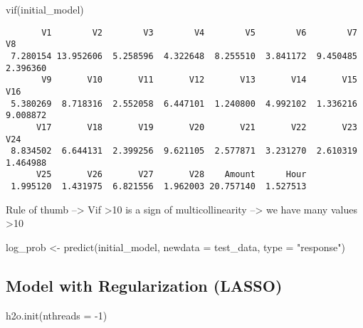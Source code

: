 \documentclass[
  11pt,
  letterpaper,
  DIV=11,
  numbers=noendperiod]{scrartcl}
\newenvironment{Shaded}{}{}
\newcommand{\AttributeTok}[1]{\textcolor[rgb]{0.84,0.23,0.29}{#1}}
\newcommand{\DecValTok}[1]{\textcolor[rgb]{0.00,0.36,0.77}{#1}}
\newcommand{\FunctionTok}[1]{\textcolor[rgb]{0.44,0.26,0.76}{#1}}
\newcommand{\NormalTok}[1]{\textcolor[rgb]{0.14,0.16,0.18}{#1}}
\newcommand{\OtherTok}[1]{\textcolor[rgb]{0.44,0.26,0.76}{#1}}
\newcommand{\SpecialCharTok}[1]{\textcolor[rgb]{0.00,0.36,0.77}{#1}}
\newcommand{\StringTok}[1]{\textcolor[rgb]{0.01,0.18,0.38}{#1}}
\begin{document}
\begin{enumerate}
\begin{Shaded}
\begin{Highlighting}[]
\FunctionTok{vif}\NormalTok{(initial\_model)}
\end{Highlighting}
\end{Shaded}

\begin{verbatim}
       V1        V2        V3        V4        V5        V6        V7        V8 
 7.280154 13.952606  5.258596  4.322648  8.255510  3.841172  9.450485  2.396360 
       V9       V10       V11       V12       V13       V14       V15       V16 
 5.380269  8.718316  2.552058  6.447101  1.240800  4.992102  1.336216  9.008872 
      V17       V18       V19       V20       V21       V22       V23       V24 
 8.834502  6.644131  2.399256  9.621105  2.577871  3.231270  2.610319  1.464988 
      V25       V26       V27       V28    Amount      Hour 
 1.995120  1.431975  6.821556  1.962003 20.757140  1.527513 
\end{verbatim}
\end{enumerate}

Rule of thumb --\textgreater{} Vif \textgreater10 is a sign of
multicollinearity --\textgreater{} we have many values \textgreater10

\begin{Shaded}
\begin{Highlighting}[]
\NormalTok{log\_prob }\OtherTok{\textless{}{-}} \FunctionTok{predict}\NormalTok{(initial\_model, }\AttributeTok{newdata =}\NormalTok{ test\_data, }\AttributeTok{type =} \StringTok{"response"}\NormalTok{)}
\end{Highlighting}
\end{Shaded}

\subsection{Model with Regularization
(LASSO)}\label{model-with-regularization-lasso}

\begin{Shaded}
\begin{Highlighting}[]
\FunctionTok{h2o.init}\NormalTok{(}\AttributeTok{nthreads =} \SpecialCharTok{{-}}\DecValTok{1}\NormalTok{)}
\end{Highlighting}
\end{Shaded}
\end{document}
